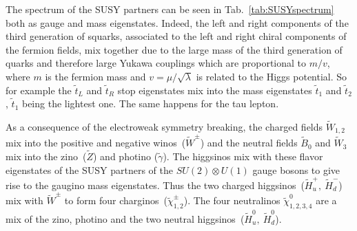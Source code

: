 The spectrum of the SUSY partners can be seen in Tab.~\ref{tab:SUSYspectrum} both as gauge and mass eigenstates. Indeed, the left and right components of the third generation of squarks, associated to the left and right chiral components of the fermion fields, mix together due to the large mass of the third generation of quarks and therefore large Yukawa couplings which are proportional to $m/v$, where $m$ is the fermion mass and $v = \mu/\sqrt{\lambda}$ is related to the Higgs potential. So  for example the $\tilde{t}_{L}$ and  $\tilde{t}_{R}$ stop eigenstates mix into the mass eigenstates  $\tilde{t}_{1}$ and  $\tilde{t}_{2}$,  $\tilde{t}_{1}$ being the lightest one. The same happens for the tau lepton.


As a consequence of the electroweak symmetry breaking, the charged fields $\tilde{W}_{1,2}$ mix into the positive and negative winos~($\tilde{W}^{\pm}$) and the neutral fields $\tilde{B}_{0}$ and $\tilde{W}_{3}$ mix into the zino~($\tilde{Z}$) and photino ($\tilde{\gamma}$). The higgsinos mix with these flavor eigenstates of the SUSY partners of the $SU(2) \otimes U(1)$ gauge bosons to give rise to the gaugino mass eigenstates. Thus the two charged higgsinos~($\tilde{H}_{u}^{+},~\tilde{H}_{d}^{-}$) mix with $\tilde{W}^{\pm}$ to form four charginos~($\tilde{\chi}_{1,2}^{\pm}$). The four neutralinos $\tilde{\chi}_{1,2,3,4}^{0}$ are a mix of the zino, photino and the two neutral higgsinos~($\tilde{H}_{u}^{0},~\tilde{H}_{d}^{0}$). 


